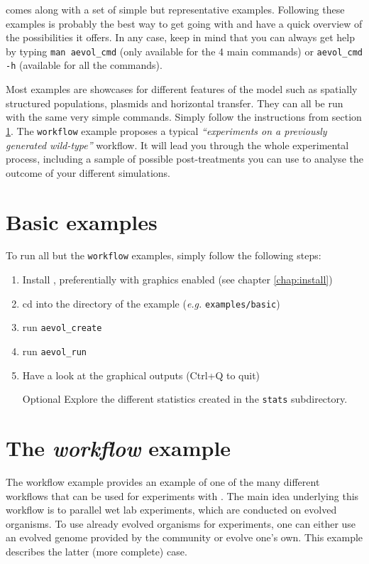 \aevol{} comes along with a set of simple but representative examples. Following these examples is probably the best way to get going with \aevol{} and have a quick overview of the possibilities it offers. In any case, keep in mind that you can always get help by typing \verb?man aevol_cmd? (only available for the 4 main commands) or \verb?aevol_cmd -h? (available for all the commands).

Most examples are showcases for different features of the model such as spatially structured populations, plasmids and horizontal transfer. They can all be run with the same very simple commands. Simply follow the instructions from section \ref{sect:basic_examples}.
The \verb?workflow? example proposes a typical \emph{``experiments on a previously generated wild-type''} workflow. It will lead you through the whole experimental process, including a sample of possible post-treatments you can use to analyse the outcome of your different simulations.


\section{Basic examples}
\label{sect:basic_examples}

To run all but the \verb?workflow? examples, simply follow the following steps:

\begin{enumerate}
\item Install \aevol{}, preferentially with graphics enabled (see chapter \ref{chap:install})
\item cd into the directory of the example (\emph{e.g.} \verb?examples/basic?)
\item
run \verb?aevol_create?
\item
run \verb?aevol_run?
\item Have a look at the graphical outputs (Ctrl+Q to quit)
\item [Optional] Explore the different statistics created in the \verb?stats? subdirectory.
\end{enumerate}


\section{The \emph{workflow} example}
The workflow example provides an example of one of the many different workflows that can be used for experiments with \aevol{}. The main idea underlying this workflow is to parallel wet lab experiments, which are conducted on evolved organisms. To use already evolved organisms for \aevol{} experiments, one can either use an evolved genome provided by the community or evolve one's own. This example describes the latter (more complete) case.


